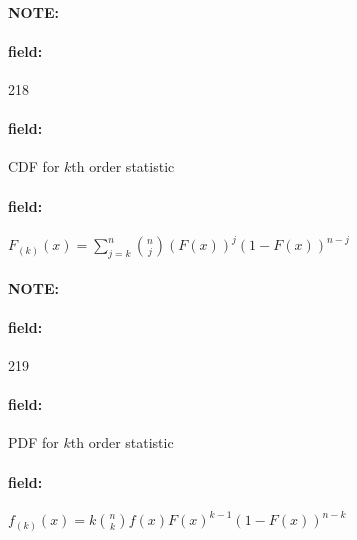 \documentclass[12pt]{article}
\newenvironment{note}{\paragraph{NOTE:}}{}
\newenvironment{field}{\paragraph{field:}}{}
\begin{document}
\begin{note} \begin{field} \tiny 218 \end{field}
  \begin{field}
    CDF for $k$th order statistic
  \end{field}
  \begin{field}
    $F_{(k)}(x) = \sum_{j = k}^n \binom{n}{j}(F(x))^j(1 -F(x))^{n-j}$
  \end{field}
\end{note}

\begin{note} \begin{field} \tiny 219 \end{field}
  \begin{field}
    PDF for $k$th order statistic
  \end{field}
  \begin{field}
    $f_{(k)}(x) = k \binom{n}{k}f(x)F(x)^{k-1}(1 - F(x))^{n-k}$
  \end{field}
\end{note}


\end{document}
